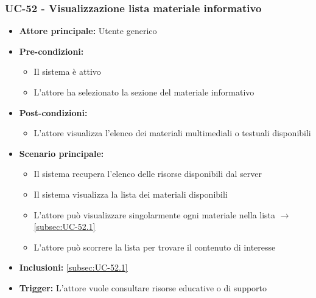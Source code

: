 \documentclass[a4paper,12pt]{article}
\begin{document}
\subsubsection{UC-52 - Visualizzazione lista materiale informativo} \label{sec:UC-52}
\begin{itemize}
    \item \textbf{Attore principale:} Utente generico
    \item \textbf{Pre-condizioni:}
    \begin{itemize}
        \item Il sistema è attivo
        \item L'attore ha selezionato la sezione del materiale informativo
    \end{itemize}
    \item \textbf{Post-condizioni:}
    \begin{itemize}
        \item L'attore visualizza l'elenco dei materiali multimediali o testuali disponibili
    \end{itemize}
    \item \textbf{Scenario principale:} 
    \begin{itemize}
        \item Il sistema recupera l'elenco delle risorse disponibili dal server
        \item Il sistema visualizza la lista dei materiali disponibili 
        \item L'attore può visualizzare singolarmente ogni materiale nella lista $\rightarrow$ \ref{subsec:UC-52.1}
        \item L'attore può scorrere la lista per trovare il contenuto di interesse
    \end{itemize}
    \item \textbf{Inclusioni:} \ref{subsec:UC-52.1}
    \item \textbf{Trigger:} L'attore vuole consultare risorse educative o di supporto
\end{itemize}
\end{document}
